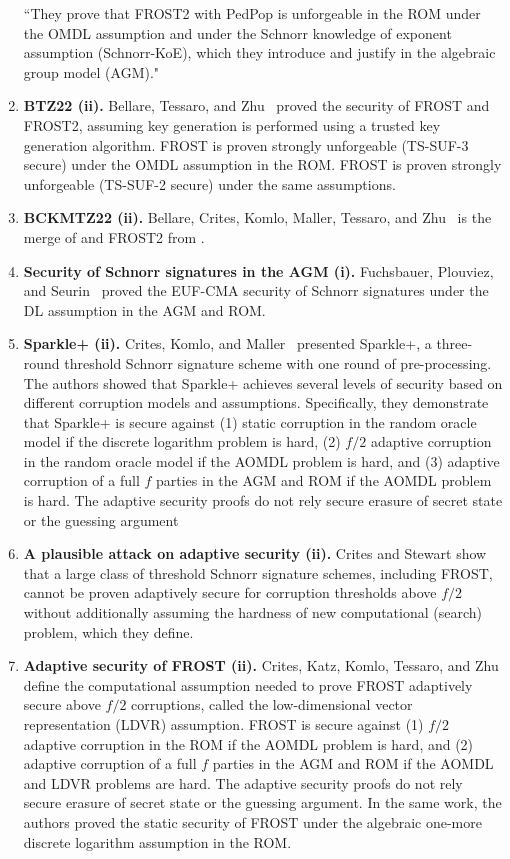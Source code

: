 \begin{enumerate}
``They prove that FROST2 with PedPop is unforgeable in the ROM under the OMDL assumption and under the Schnorr
knowledge of exponent assumption (Schnorr-KoE), which they introduce and justify in the algebraic group model (AGM)."
\item \textbf{BTZ22 (ii).} Bellare, Tessaro, and Zhu~\cite{BellareTZ22} proved the security of FROST and FROST2, assuming key generation is performed using a trusted key generation algorithm.  FROST is proven strongly unforgeable (TS-SUF-3 secure) under the OMDL assumption in the ROM. FROST is proven strongly unforgeable (TS-SUF-2 secure) under the same assumptions.  
\item \textbf{BCKMTZ22 (ii).} Bellare, Crites, Komlo, Maller, Tessaro, and Zhu~\cite{BellareCKMTZ22} is the merge of \cite{BellareTZ22} and FROST2 from \cite{CritesKM21}.
\item \textbf{Security of Schnorr signatures in the AGM (i).}  Fuchsbauer, Plouviez, and Seurin~\cite{FuchsbauerPS20} proved the EUF-CMA security of Schnorr signatures under the DL assumption in the AGM and ROM. 
\item \textbf{Sparkle+ (ii).} Crites, Komlo, and Maller~\cite{CritesKM23} presented Sparkle+, a three-round threshold Schnorr signature scheme with one round of pre-processing.  The authors showed that Sparkle+ achieves several levels of security based on different corruption models and assumptions.  Specifically, they demonstrate that Sparkle+ is secure against (1) static corruption in the random oracle model if the discrete logarithm problem is hard, (2) $f/2$ adaptive corruption in the random oracle model if the AOMDL problem is hard, and (3) adaptive corruption of a full $f$ parties in the AGM and ROM if the AOMDL problem is hard.  The adaptive security proofs do not rely secure erasure of secret state or the guessing argument    
\item \textbf{A plausible attack on adaptive security (ii).}  Crites and Stewart show that a large class of threshold Schnorr signature schemes, including FROST, cannot be proven adaptively secure for corruption thresholds above $f/2$ without additionally assuming the hardness of new computational (search) problem, which they define.
\item \textbf{Adaptive security of FROST (ii).}  Crites, Katz, Komlo, Tessaro, and Zhu define the computational assumption needed to prove FROST adaptively secure above $f/2$ corruptions, called the low-dimensional vector representation (LDVR) assumption.  FROST is secure against (1) $f/2$ adaptive corruption in the ROM  if the AOMDL problem is hard, and (2) adaptive corruption of a full $f$ parties in the AGM and ROM if the AOMDL and LDVR problems are hard.  The adaptive security proofs do not rely secure erasure of secret state or the guessing argument.
In the same work, the authors proved the static security of FROST under the algebraic one-more discrete logarithm assumption in the ROM.
\end{enumerate}


